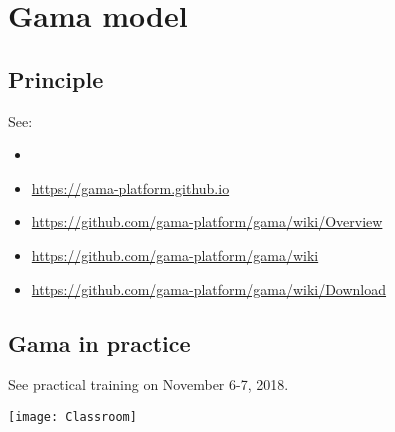 \chapter{Gama model}

\section{Principle}

See:
\begin{itemize}
	\item \citet{Grignard2013}
	\item \url{https://gama-platform.github.io}
	\item \url{https://github.com/gama-platform/gama/wiki/Overview}
	\item \url{https://github.com/gama-platform/gama/wiki}
	\item \url{https://github.com/gama-platform/gama/wiki/Download}
\end{itemize}


\section{Gama in practice}

See practical training on November 6-7, 2018.
\bigskip

\noindent
\texttt{[image: Classroom]}

